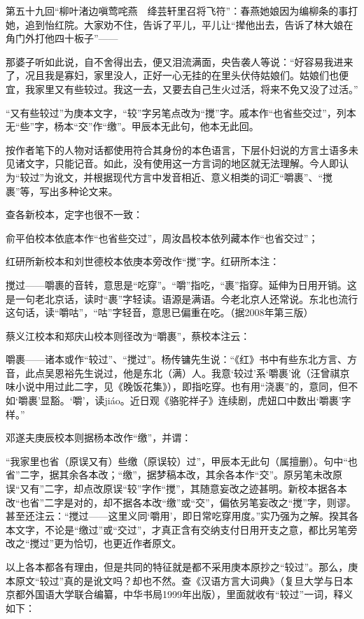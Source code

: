 第五十九回“柳叶渚边嗔莺咤燕　绛芸轩里召将飞符”：春燕她娘因为编柳条的事打她，追到怡红院。大家劝不住，告诉了平儿，平儿让“撵他出去，告诉了林大娘在角门外打他四十板子”------

那婆子听如此说，自不舍得出去，便又泪流满面，央告袭人等说：“好容易我进来了，况且我是寡妇，家里没人，正好一心无挂的在里头伏侍姑娘们。姑娘们也便宜，我家里{又有些较过}。我这一去，又要去自己生火过活，将来不免又没了过活。”

“又有些较过”为庚本文字，“较”字另笔点改为“搅”字。戚本作“也省些交过”，列本无“些”字，杨本“交”作“缴”。甲辰本无此句，他本无此回。

按作者笔下的人物对话都使用符合其身份的本色语言，下层仆妇说的方言土语多未见诸文字，只能记音。如此，没有使用这一方言词的地区就无法理解。今人即认为“较过”为讹文，并根据现代方言中发音相近、意义相类的词汇“嚼裹”、“搅裹”等，写出多种论文来。

查各新校本，定字也很不一致：

俞平伯校本依底本作“也省些交过”，周汝昌校本依列藏本作“也省交过”；

红研所新校本和刘世德校本依庚本旁改作“搅”字。红研所本注：

搅过------嚼裹的音转，意思是“吃穿”。“嚼”指吃，“裹”指穿。延伸为日用开销。这是一句老北京话，读时“裹”字轻读。语源是满语。今老北京人还常说。东北也流行这句话，读“嚼咕”，“咕”字轻音，意思已偏重在吃。（据2008年第三版）

蔡义江校本和郑庆山校本则径改为“嚼裹”，蔡校本注云：

嚼裹------诸本或作“较过”、“搅过”。杨传镛先生说：“《红》书中有些东北方言、方音，此点吴恩裕先生说过，他是东北（满）人。我意‘较过’系‘嚼裹’讹（汪曾祺京味小说中用过此二字，见《晚饭花集》），即指吃穿。也有用“浇裹”的，意同，但不如‘嚼裹’显豁。‘嚼’，读jiáo。近日观《骆驼祥子》连续剧，虎妞口中数出‘嚼裹’字样。”

邓遂夫庚辰校本则据杨本改作“缴”，并谓：

“我家里也省（原误又有）些缴（原误较）过”，甲辰本无此句（属擅删）。句中“也省”二字，据其余各本改；“缴”，据梦稿本改，其余各本作“交”。原另笔未改原误“又有”二字，却点改原误“较”字作“搅”，其随意妄改之迹甚明。新校本据各本改“也省”二字是对的，却不据各本改“缴”或“交”，偏依另笔妄改之“搅”字，则谬。甚至还注云：“搅过------这里义同‘嚼用’，即日常吃穿用度。”实乃强为之解。揆其各本文字，不论是“缴过”或“交过”，才真正含有交纳支付日用开支之意，都比另笔旁改之“搅过”更为恰切，也更近作者原文。

以上各本都各有理由，但是共同的特征就是都不采用庚本原抄之“较过”。那么，庚本原文“较过”真的是讹文吗？却也不然。查《汉语方言大词典》（复旦大学与日本京都外国语大学联合编纂，中华书局1999年出版），里面就收有“较过”一词，释义如下：

